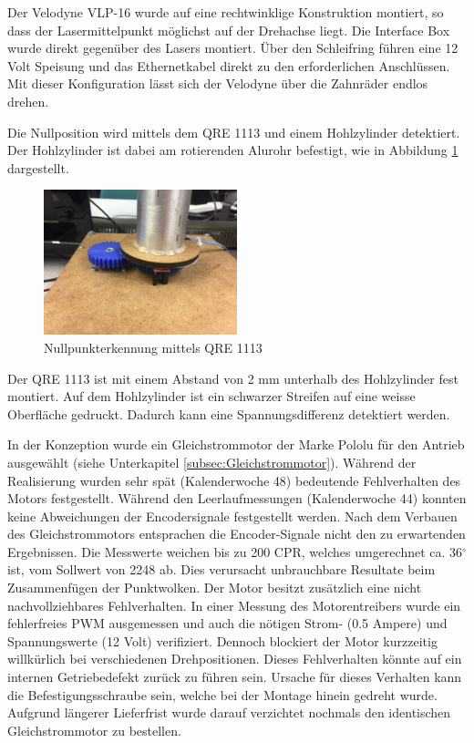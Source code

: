 Der Velodyne VLP-16 wurde auf eine rechtwinklige Konstruktion montiert, so dass der Lasermittelpunkt möglichst auf der Drehachse liegt. Die Interface Box wurde direkt gegenüber des Lasers montiert. Über den Schleifring führen eine 12 Volt Speisung und das Ethernetkabel direkt zu den erforderlichen Anschlüssen. Mit dieser Konfiguration lässt sich der Velodyne über die Zahnräder endlos drehen.

Die Nullposition wird mittels dem QRE 1113 und einem Hohlzylinder detektiert. Der Hohlzylinder ist dabei am rotierenden Alurohr befestigt, wie in Abbildung \ref{fig:Nullposition} dargestellt.

\begin{figure}[H]
	\centering
	\includegraphics[angle=180,width=0.5\textwidth]{resources/Nullposition.jpg}
	\caption[{Nullpunkterkennung mittels QRE 1113}]{Nullpunkterkennung mittels QRE 1113}
	\label{fig:Nullposition}
\end{figure} 

Der QRE 1113 ist mit einem Abstand von 2 mm unterhalb des Hohlzylinder fest montiert. Auf dem Hohlzylinder ist ein schwarzer Streifen auf eine weisse Oberfläche gedruckt. Dadurch kann eine Spannungsdifferenz detektiert werden.

In der Konzeption wurde ein Gleichstrommotor der Marke Pololu für den Antrieb ausgewählt (siehe Unterkapitel \ref{subsec:Gleichstrommotor}). Während der Realisierung wurden sehr spät (Kalenderwoche 48) bedeutende Fehlverhalten des Motors festgestellt. Während den Leerlaufmessungen (Kalenderwoche 44) konnten keine Abweichungen der Encodersignale festgestellt werden. Nach dem Verbauen des Gleichstrommotors entsprachen die Encoder-Signale nicht den zu erwartenden Ergebnissen. Die Messwerte weichen bis zu 200 \ac{CPR}, welches umgerechnet ca. 36$^\circ$ ist, vom Sollwert von 2248 ab. Dies verursacht unbrauchbare Resultate beim Zusammenfügen der Punktwolken. Der Motor besitzt zusätzlich eine nicht nachvollziehbares Fehlverhalten. In einer Messung des Motorentreibers wurde ein fehlerfreies \ac{PWM} ausgemessen und auch die nötigen Strom- (0.5 Ampere) und Spannungswerte (12 Volt) verifiziert. Dennoch blockiert der Motor kurzzeitig willkürlich bei verschiedenen Drehpositionen. Dieses Fehlverhalten könnte auf ein internen Getriebedefekt zurück zu führen sein. Ursache für dieses Verhalten kann die Befestigungsschraube sein, welche bei der Montage hinein gedreht wurde. Aufgrund längerer Lieferfrist wurde darauf verzichtet nochmals den identischen Gleichstrommotor zu bestellen. 

